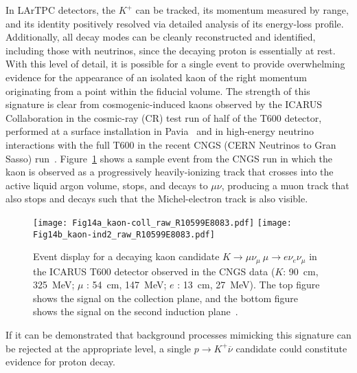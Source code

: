 In LArTPC detectors, the $K^+$ can be tracked, its momentum measured
by range, and its identity positively resolved via detailed analysis
of its energy-loss profile.  Additionally, all decay modes can be
cleanly reconstructed and identified, including those with neutrinos,
since the decaying proton is essentially at rest.  With this level of
detail, it is possible for a single event to provide overwhelming
evidence for the appearance of an isolated kaon of the right momentum
originating from a point within the fiducial volume.  The strength of
this signature is clear from cosmogenic-induced kaons observed by the
ICARUS Collaboration in the cosmic-ray (CR) test run of half of the T600
detector, performed at a surface installation in Pavia~\cite{Amerio:2004ze} 
and in high-energy neutrino interactions with the full T600 in the recent 
CNGS (CERN Neutrinos to Gran Sasso) run~\cite{Antonello:2012hu}.
Figure~\ref{fig:icaruskaon} shows a sample event from the CNGS run in
which the kaon is observed as a progressively heavily-ionizing track 
that crosses into the active liquid argon volume, stops, and
decays to $\mu\nu$, producing a muon track that also stops and decays
such that the Michel-electron track is also visible. 
%
\begin{figure}[!htb]
\centering
\texttt{[image: Fig14a\_kaon-coll\_raw\_R10599E8083.pdf]}
\texttt{[image: Fig14b\_kaon-ind2\_raw\_R10599E8083.pdf]}
\caption[Decaying kaon observed during the ICARUS run at CNGS]
{Event display for a decaying kaon candidate $K \rightarrow \mu \nu_\mu \ \mu \rightarrow e \nu_e \nu_\mu$ 
in the ICARUS T600 detector observed
in the CNGS data ($K$: \SI{90}{\cm}, \SI{325}{\MeV}; $\mu$ : \SI{54}{\cm}, \SI{147}{\MeV}; 
$e$ : \SI{13}{\cm}, \SI{27}{\MeV}). The top figure shows the signal on the collection plane,
  and the bottom figure shows the signal on the second induction plane~\cite{Antonello:2012hu}.}
\label{fig:icaruskaon}
\end{figure}

If it can be demonstrated that background processes mimicking this
signature can be rejected at the appropriate level, 
a single $p\to K^+\overline{\nu}$ candidate could constitute 
evidence for proton decay. %


